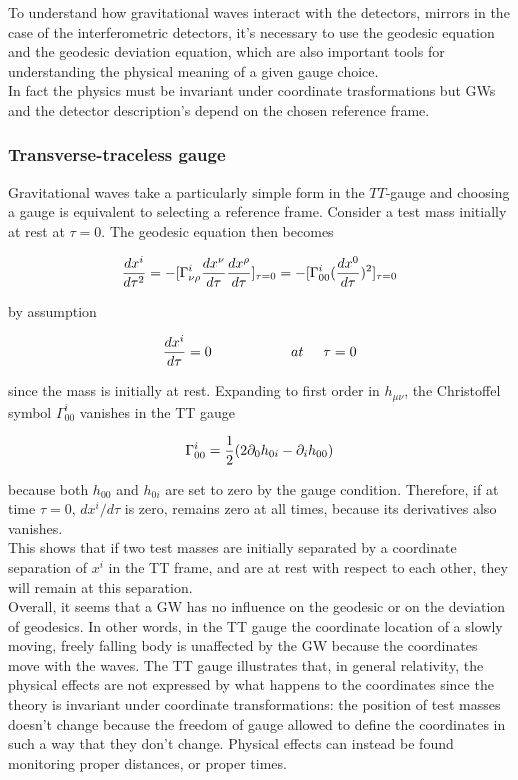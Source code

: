 \documentclass[binding=0.6cm, LaM]{sapthesis}
\begin{document}
	To understand how gravitational waves interact with the detectors, mirrors in the case of the interferometric detectors, 
	it's necessary to use the geodesic equation and the geodesic deviation equation, which are also important tools 
	for understanding the physical meaning of a given gauge choice. \\
	In fact the physics must be invariant under coordinate trasformations but GWs and the detector description's depend on the chosen reference frame.

\subsubsection{Transverse-traceless gauge}
	Gravitational waves take a particularly simple form in the $TT$-gauge 
	and choosing a gauge is equivalent to selecting a reference frame. 
	Consider a test mass initially at rest at $\tau = 0$. The geodesic equation then becomes

		\begin{equation}
		{{dx^i}\over{d\tau^2}} = -[\Gamma^i_{\nu\rho}{{dx^{\nu}}\over{d\tau}}{{dx^{\rho}}\over{d\tau}}]_{\tau=0} \\ 
		= - [ \Gamma^i_{00}({{dx^0}\over{d\tau}})^2]_{\tau=0}
		\end{equation}

	by assumption
		
		\begin{equation}
		{{dx^i}\over{d\tau}} = 0 \hspace*{2cm} at \hspace*{0.5cm}\tau = 0
		\end{equation}

	since the mass is initially at rest. Expanding to first order in $h_{\mu\nu}$, 
	the Christoffel symbol $\Gamma^i_{00}$ vanishes in the TT gauge

		\begin{equation}
		\Gamma^i_{00} = {1 \over {2}}(2\partial_{0}h_{0i} - \partial_i h_{00})
		\end{equation}

	because both $h_{00}$ and $h_{0i}$ are set to zero by the gauge condition. 
	Therefore, if at time $\tau = 0$, $dx^i/d\tau$ is zero, remains zero at all times, 
	because its derivatives also vanishes. \\
	This shows that if two test masses are initially separated by a coordinate separation of $x^i$ in the TT frame, 
	and are at rest with respect to each other, they will remain at this separation. \\
	Overall, it seems that a GW has no influence on the geodesic or on the deviation of geodesics.
	In other words, in the TT gauge the coordinate location of a slowly moving, freely falling body is unaffected 
	by the GW because the coordinates move with the waves.
	The TT gauge illustrates that, in general relativity, the physical effects are not expressed by what happens 
	to the coordinates since the theory is invariant under coordinate transformations:
	the position of test masses doesn't change because the freedom of gauge allowed to define the coordinates 
	in such a way that they don't change.
	Physical effects can instead be found monitoring proper distances, or proper times.
\end{document}
